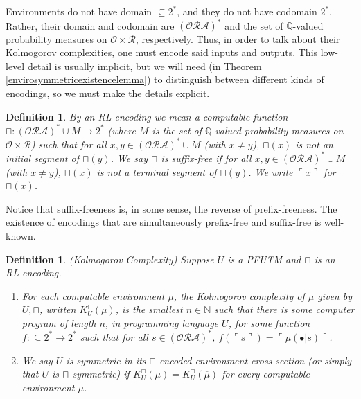 \documentclass[runningheads]{llncs}
\newtheorem{mydefinition}[mytheorem]{Definition}
\begin{document}
Environments do not have domain $\subseteq 2^*$, and they do not
have codomain $2^*$.
Rather, their domain and codomain are $(\mathcal O\mathcal R\mathcal A)^*$
and the set of $\mathbb Q$-valued probability measures on $\mathcal O\times\mathcal R$,
respectively.
Thus, in order to talk about their Kolmogorov complexities,
one must encode said inputs and outputs. This low-level detail is
usually implicit, but we will need (in Theorem \ref{envirosymmetricexistencelemma})
to distinguish between different kinds of encodings, so we must make the
details explicit.

\begin{mydefinition}
    By an \emph{RL-encoding} we mean a computable function
    $\sqcap:(\mathcal O\mathcal R\mathcal A)^*\cup M\to 2^*$
    (where $M$ is the set of $\mathbb Q$-valued probability-measures
    on $\mathcal O\times\mathcal R$) such that
    for all $x,y\in (\mathcal O\mathcal R\mathcal A)^*\cup M$ (with $x\not=y$),
    $\sqcap(x)$ is not an initial segment of $\sqcap(y)$.
    We say $\sqcap$ is
    \emph{suffix-free} if
    for all $x,y\in (\mathcal O\mathcal R\mathcal A)^*\cup M$ (with $x\not=y$),
    $\sqcap(x)$ is not a terminal segment of $\sqcap(y)$.
    We write $\ulcorner x\urcorner$ for $\sqcap(x)$.
\end{mydefinition}

Notice that suffix-freeness is, in some sense, the reverse of prefix-freeness.
The existence of encodings that are simultaneously prefix-free and suffix-free
is well-known.

\begin{mydefinition}
(Kolmogorov Complexity)
Suppose $U$ is a PFUTM and $\sqcap$ is an RL-encoding.
\begin{enumerate}
    \item
    For each computable environment $\mu$, the \emph{Kolmogorov complexity of $\mu$
    given by $U,\sqcap$}, written $K^\sqcap_U(\mu)$,
    is the smallest $n\in\mathbb N$ such that
    there is some computer program of length $n$, in programming language $U$,
    for some function $f:\subseteq 2^*\to 2^*$ such that
    for all $s\in (\mathcal O\mathcal R\mathcal A)^*$,
    $f(\ulcorner s\urcorner)=\ulcorner \mu(\bullet|s)\urcorner$.
    \item
    We say $U$ is \emph{symmetric in its $\sqcap$-encoded-environment
    cross-section} (or simply that $U$ is \emph{$\sqcap$-symmetric}) if
    $K^\sqcap_U(\mu)=K^\sqcap_U(\overline\mu)$ for every computable environment $\mu$.
\end{enumerate}
\end{mydefinition}
\end{document}
